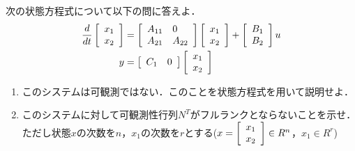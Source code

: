 \item
次の状態方程式について以下の問に答えよ．
\begin{align}
	\frac{d}{dt}
	\bmatrix{c}
		x_1 \\
		x_2
	\ematrix
	&=	\bmatrix{ll}
			A_{11} & 0 \\
			A_{21} & A_{22}
		\ematrix
		\bmatrix{c}
			x_1 \\
			x_2
		\ematrix
		+
		\bmatrix{c}
			B_1 \\
			B_2
		\ematrix
		u
\nonumber \\
	y 
	&=	\bmatrix{cc}
			C_1 & 0 
		\ematrix
		\bmatrix{c}
			x_1 \\
			x_2
		\ematrix
\nonumber
\end{align}

\begin{enumerate}
\item 
このシステムは可観測ではない．このことを状態方程式を用いて説明せよ．
\vspace{6cm}

\item
このシステムに対して可観測性行列$N^T$がフルランクとならないことを示せ．ただし状態$x$の次数を$n$，$x_1$の次数を$r$とする($x = \bmatrix{c} x_1 \\ x_2 \ematrix \in R^{n}$，$x_1 \in R^{r}$)
\vspace{8cm}
\end{enumerate}
